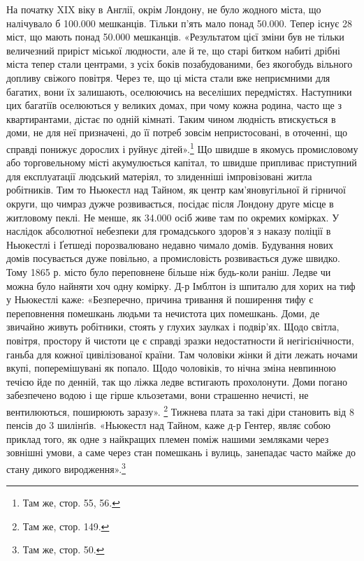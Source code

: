На початку XIX віку в Англії, окрім Лондону, не було жодного
міста, що налічувало б \num{100.000} мешканців. Тільки п’ять
мало понад \num{50.000}. Тепер існує 28 міст, що мають понад \num{50.000} мешканців.
«Результатом цієї зміни був не тільки величезний приріст
міської людности, але й те, що старі битком набиті дрібні
міста тепер стали центрами, з усіх боків позабудованими, без
якогобудь вільного допливу свіжого повітря. Через те, що ці
міста стали вже неприємними для багатих, вони їх залишають,
оселюючись на веселіших передмістях. Наступники цих багатіїв
оселюються у великих домах, при чому кожна родина, часто ще
з квартирантами, дістає по одній кімнаті. Таким чином людність
втискується в доми, не для неї призначені, до її потреб зовсім
непристосовані, в оточенні, що справді понижує дорослих і руйнує
дітей».\footnote{
Там же, стор. 55, 56.
} Що швидше в якомусь промисловому або торговельному
місті акумулюється капітал, то швидше припливає
приступний для експлуатації людський матеріял, то злиденніші
імпровізовані житла робітників. Тим то Ньюкестл над Тайном,
як центр кам’яновугільної й гірничої округи, що чимраз дужче
розвивається, посідає після Лондону друге місце в житловому
пеклі. Не менше, як \num{34.000} осіб живе там по окремих комірках.
У наслідок абсолютної небезпеки для громадського здоров’я
з наказу поліції в Ньюкестлі і Ґетшеді порозвалювано недавно
чимало домів. Будування нових домів посувається дуже повільно,
а промисловість розвивається дуже швидко. Тому 1865 р.
місто було переповнене більше ніж будь-коли раніш. Ледве
чи можна було найняти хоч одну комірку. Д-р Імблтон із шпиталю
для хорих на тиф у Ньюкестлі каже: «Безперечно, причина
тривання й поширення тифу є переповнення помешкань людьми
та нечистота цих помешкань. Доми, де звичайно живуть робітники,
стоять у глухих заулках і подвір’ях. Щодо світла, повітря,
простору й чистоти це є справді зразки недостатности й негігієнічности,
ганьба для кожної цивілізованої країни. Там чоловіки
жінки й діти лежать ночами вкупі, поперемішувані як попало.
Щодо чоловіків, то нічна зміна невпинною течією йде по
денній, так що ліжка ледве встигають прохолонути. Доми погано
забезпечено водою і ще гірше кльозетами, вони страшенно нечисті,
не вентилюються, поширюють заразу». \footnote{
Там же, стор. 149.
} Тижнева плата
за такі діри становить від 8 пенсів до 3 шилінґів. «Ньюкестл
над Тайном, каже д-р Гентер, являє собою приклад того, як
одне з найкращих племен поміж нашими земляками через зовнішні
умови, а саме через стан помешкань і вулиць, занепадає
часто майже до стану дикого виродження».\footnote{
Там же, стор. 50.
}


